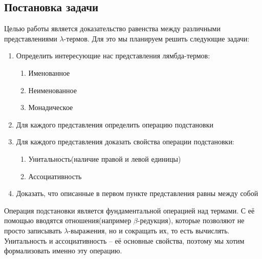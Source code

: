 \subsection{Постановка задачи}
Целью работы является доказательство равенства между различными представлениями $\lambda$-термов. Для это мы планируем решить следующие задачи:

\begin{enumerate}
  \item Определить интересующие нас представления лямбда-термов:
    \begin{enumerate}
      \item Именованное
      \item Неименованное
      \item Монадическое
    \end{enumerate}
  \item Для каждого представления определить операцию подстановки
  \item Для каждого представления доказать свойства операции подстановки:
    \begin{enumerate}
      \item Унитальность(наличие правой и левой единицы)
      \item Ассоциативность
    \end{enumerate}
  \item Доказать, что описанные в первом пункте представления равны между собой
\end{enumerate}

Операция подстановки является фундаментальной операцией над термами. С её помощью вводятся отношения(например $\beta$-редукция), которые позволяют не просто записывать $\lambda$-выражения, но и сокращать их, то есть вычислять. Унитальность и ассоциативность -- её основные свойства, поэтому мы хотим формализовать именно эту операцию.
